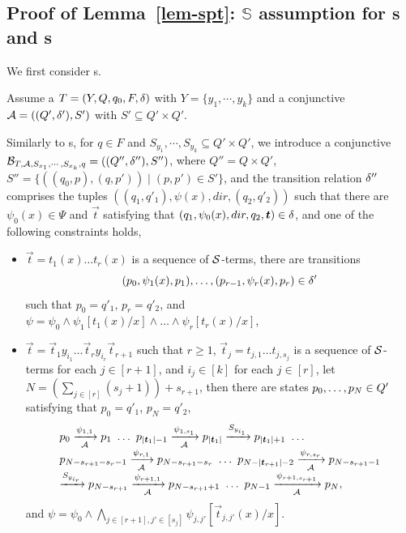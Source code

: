 
\subsection{Proof of Lemma~\ref{lem-spt}: $\mathbb{S}$\prerec{} assumption for \SSPT{}s and \SPT{}s}

We first consider \SSPT{}s. 

Assume a \SSPT{} $T=(Y, Q, q_0, F, \delta)$ with $Y = \{y_1,\cdots, y_k\}$ and a conjunctive \SA{} $\mathcal{A} = ((Q', \delta'), S')$ with $S' \subseteq Q' \times Q'$. 

Similarly to \FFA{}s, for $q \in F$ and  $S_{y_1}, \cdots, S_{y_k} \subseteq Q' \times Q'$, we  introduce a conjunctive \SSA{} $\mathcal{B}_{T, \mathcal{A}, S_{x_1}, \cdots, S_{x_k}, q} = ((Q'', \delta''), S'')$, where $Q'' = Q \times Q'$, $S'' = \{((q_0, p), (q, p')) \mid (p, p') \in S'\}$, and the transition relation $\delta''$ comprises the tuples 
$((q_1, q'_1), \psi(x), dir, (q_2, q'_2))$ such that there are $\psi_0(x) \in \Psi$ and $\vec{t}$ satisfying that $(q_1, \psi_0(x), dir, q_2, \vec{t}) \in \transrel$, and one of the following constraints holds, 
\begin{itemize}
\item $\vec{t} = t_1(x) \ldots t_r(x)$ is a sequence of $\mathcal{S}$-terms, there are transitions 
$$(p_{0}, \psi_1(x), p_{1}), \ldots, (p_{r-1}, \psi_r(x), p_r) \in \delta'$$ 
such that $p_0 = q'_1$, $p_r = q'_2$, and $\psi = \psi_0 \wedge \psi_1[t_1(x)/x] \wedge \ldots \wedge \psi_r[t_r(x)/x]$,
%
\item $\vec{t} = \vec{t}_1 y_{i_1} \ldots \vec{t}_{r} y_{i_{r}} \vec{t}_{r+1}$ such that $r \ge 1$, $\vec{t}_j = t_{j, 1} \ldots t_{j, s_j}$ is a sequence of $\mathcal{S}$-terms for each $j \in [r+1]$,  and $i_j \in [k]$ for each $j \in [r]$, let $N = (\sum \limits_{j \in [r]} (s_j+ 1)) +s_{r+1}$, then there are states $p_0, \ldots, p_{N} \in Q'$ satisfying that $p_0 = q'_1$, $p_{N} = q'_2$,  
%
$$
\begin{array}{l}
p_0 \xrightarrow[\Aut]{\psi_{1,1}} p_1\ \ldots\ p_{|\vec{t}_1|-1} \xrightarrow[\Aut]{\psi_{1, s_1}} p_{|\vec{t}_1|} \xrightarrow{S_{y_{i_1}}} p_{|\vec{t}_1|+1}\ \ldots\\
p_{N - s_{r+1} - s_r -1} \xrightarrow[\Aut]{\psi_{r, 1}} p_{N - s_{r+1} - s_r } \ \ldots\ p_{N - |\vec{t}_{r+1}| - 2} \xrightarrow[\Aut]{\psi_{r, s_r}} p_{N-s_{r+1}-1}\\
 \xrightarrow{S_{y_{i_r}}} p_{N- s_{r+1}} \xrightarrow[\Aut]{\psi_{r+1, 1}} p_{N -s_{r+1}+1}\ \ldots\ p_{N - 1} \xrightarrow[\Aut]{\psi_{r+1,  s_{r+1}} } p_{N},
\end{array}
 $$ 
 and $\psi = \psi_0 \wedge \bigwedge \limits_{j \in [r+1], j' \in [s_j]} \psi_{j, j'} [\vec{t}_{j, j'}(x)/x].$
\end{itemize}
